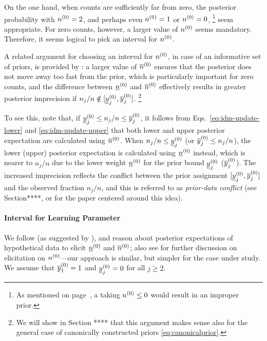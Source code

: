 On the one hand, when counts are sufficiently far from zero,
the posterior probability with $n^{(0)}=2$, and perhaps even $n^{(0)}=1$ or $n^{(0)}=0$,%
\footnote{As mentioned on page~\pageref{eq:canonicalprior},
a taking $n^{(0)} \le 0$ would result in an improper prior.}
seem appropriate.
For zero counts, however, a larger value of $n^{(0)}$ seems mandatory.
Therefore, it seems logical to pick an interval for $n^{(0)}$.

A related argument for choosing an interval for $n^{(0)}$,
in case of an informative set of priors,
is provided by \textcite[p.~225, \S 5.4.4]{1991:walley}:
a larger value of $\overline{n}^{(0)}$ ensures that the posterior does not move away too fast from the prior,
which is particularly important for zero counts,
and the difference between $\underline{n}^{(0)}$ and $\overline{n}^{(0)}$ effectively results in greater posterior
imprecision if $n_j/n \notin [\underline{y}^{(0)}_j,\overline{y}^{(0)}_j]$.%
\footnote{We will show in Section **** that this argument makes sense
also for the general case of canonically constructed priors \eqref{eq:canonicalprior}.}

To see this, note that, if $\underline{y}^{(0)}_j \le n_j/n \le \overline{y}^{(0)}_j$, it follows from
Eqs.~\eqref{eq:idm-update-lower} and \eqref{eq:idm-update-upper}
that both lower and upper posterior expectation are calculated using $\overline{n}^{(0)}$.
When $n_j/n \le \underline{y}^{(0)}_j$ (or $\overline{y}^{(0)}_j \le n_j/n$),
the lower (upper) posterior expectation is calculated using $\underline{n}^{(0)}$ instead,
which is nearer to $n_j/n$ due to the lower weight $\underline{n}^{(0)}$ for the prior bound $\underline{y}^{(0)}_j$ ($\overline{y}^{(0)}_j$).
The increased imprecision reflects the conflict between the prior assignment
$[\underline{y}^{(0)}_j,\overline{y}^{(0)}_j]$ and the observed fraction $n_j/n$,
and this is referred to as \emph{prior-data conflict}
(see Section****, or \textcite{Walter2009a} for the paper centered around this idea).

\paragraph{Interval for Learning Parameter}

We follow \textcite[p.~19]{1965:good} (as suggested by \textcite[Note~5.4.1, p.~524]{1991:walley}),
and reason about posterior expectations of hypothetical data to elicit $\underline{n}^{(0)}$ and $\overline{n}^{(0)}$;
also see \textcite[p.~219, \S 5.3.3]{1991:walley} for further
discussion on elicitation on $n^{(0)}$---our approach is similar, but simpler for the case under study.
We assume that $\overline{y}^{(0)}_1=1$ and $\underline{y}^{(0)}_j=0$ for all $j\ge 2$.

